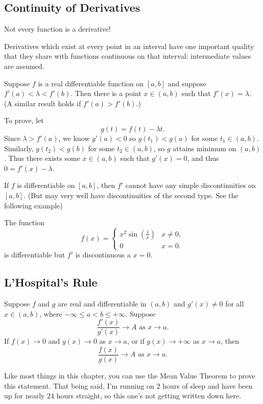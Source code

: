 \documentclass{article}
\begin{document}
\subsection{Continuity of Derivatives}
\begin{moral}
    Not every function is a derivative!
\end{moral}
Derivatives which exist at every point in an interval have one important quality that they share with functions continuous on that interval: intermediate values are assumed.
\begin{theorem}
    Suppose $f$ is a real differentiable function on $[a,b]$ and suppose $f'(a)<\lambda<f'(b)$. Then there is a point $x\in(a,b)$ such that $f'(x)=\lambda$. (A similar result holds if $f'(a)>f'(b)$.)
\end{theorem}
\begin{remark}
    To prove, let\[g(t)=f(t)-\lambda t.\]Since $\lambda>f'(a)$, we know $g'(a)<0$ so $g(t_{1})<g(a)$ for some $t_{1}\in(a,b)$. Similarly, $g(t_{2})<g(b)$ for some $t_{2}\in(a,b)$, so $g$ attains minimum on $(a,b)$. Thus there exists some $x\in(a,b)$ such that $g'(x)=0$, and thus $0=f'(x)-\lambda$.
\end{remark}
\begin{corollary}
    If $f$ is differentiable on $[a,b]$, then $f'$ cannot have any simple discontinuities on $[a,b]$. (But may very well have discontinuities of the second type. See the following example)
\end{corollary}
\begin{example}[Deja vu]
    The function \[f(x)=\begin{cases}
        x^{2}\sin(\frac{1}{x}) & x\neq 0,\\
        0 & x=0.
    \end{cases}\]is differentiable but $f'$ is discontinuous a $x=0$.
\end{example}

\subsection{L'Hospital's Rule}
\begin{theorem}
    Suppose $f$ and $g$ are real and differentiable in $(a,b)$ and $g'(x)\neq 0$ for all $x\in (a,b)$, where $-\infty\leq a<b\leq+\infty$. Suppose
    \[\frac{f'(x)}{g'(x)}\rightarrow A\textrm{ as }x\rightarrow a.\]
    If $f(x)\rightarrow 0$ and $g(x)\rightarrow 0$ as $x\rightarrow a$, or if $g(x)\rightarrow+\infty$ as $x\rightarrow a$, then \[\frac{f(x)}{g(x)}\rightarrow A\textrm{ as }x\rightarrow a.\]
\end{theorem}
\begin{remark}
    Like most things in this chapter, you can use the Mean Value Theorem to prove this statement. That being said, I'm running on 2 hours of sleep and have been up for nearly 24 hours straight, so this one's not getting written down here.
\end{remark}
\end{document}
